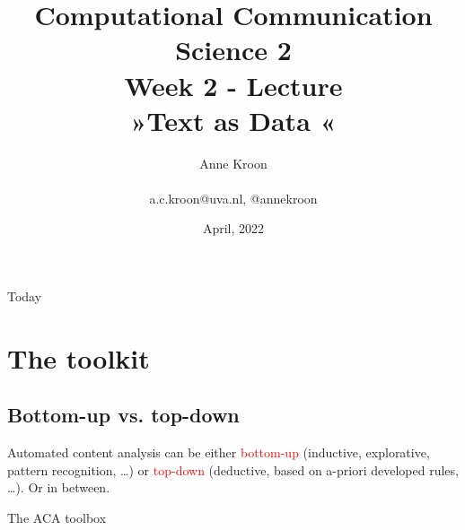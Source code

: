 \documentclass[handout]{beamer}
\title[Computational Communication Science 2]{\textbf{Computational Communication Science 2} \\Week 2 - Lecture\\ »Text as Data «}
\author[Anne Kroon]{Anne Kroon \\ ~ \\ \footnotesize{ a.c.kroon@uva.nl, @annekroon} \\}
\date{April, 2022}
\institute[Digital Society Minor, University of Amsterdam]{Digital Society Minor, University of Amsterdam}
\begin{document}
	
	\begin{frame}{}
		\titlepage
	\end{frame}
	
	\begin{frame}{Today}
		\begin{tiny}
		\tableofcontents
		\end{tiny}
	\end{frame}


\section{The toolkit}

\subsection{Bottom-up vs. top-down}

\begin{frame}[standout]
	Automated content analysis can be either \textcolor{red}{bottom-up} (inductive, explorative, pattern recognition, \ldots) or \textcolor{red}{top-down} (deductive, based on a-priori developed rules, \ldots). Or in between.
\end{frame}


\begin{frame}{The ACA toolbox}
	\\
	\cite{Boumans2016}
\end{frame}
\end{document}
